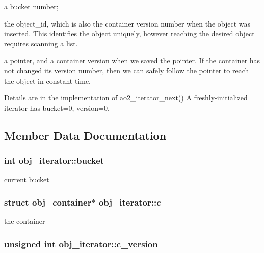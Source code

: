 \begin{DoxyItemize}
\item a bucket number;
\item the object\_\-id, which is also the container version number when the object was inserted. This identifies the object uniquely, however reaching the desired object requires scanning a list.
\item a pointer, and a container version when we saved the pointer. If the container has not changed its version number, then we can safely follow the pointer to reach the object in constant time.
\end{DoxyItemize}

Details are in the implementation of ao2\_\-iterator\_\-next() A freshly-\/initialized iterator has bucket=0, version=0. 

\subsection{Member Data Documentation}
\hypertarget{structobj__iterator_a5c2c1cc03d280d34568eb6abade757bb}{
\subsubsection[{bucket}]{\setlength{\rightskip}{0pt plus 5cm}int {\bf obj\_\-iterator::bucket}}}
\label{structobj__iterator_a5c2c1cc03d280d34568eb6abade757bb}
current bucket \hypertarget{structobj__iterator_a5ecf21f7dd1f55e01db059a59c9d0d85}{
\subsubsection[{c}]{\setlength{\rightskip}{0pt plus 5cm}struct obj\_\-container$\ast$ {\bf obj\_\-iterator::c}}}
\label{structobj__iterator_a5ecf21f7dd1f55e01db059a59c9d0d85}
the container \hypertarget{structobj__iterator_afb5ef4e84bc1785aa3948f502bae545c}{
\subsubsection[{c\_\-version}]{\setlength{\rightskip}{0pt plus 5cm}unsigned int {\bf obj\_\-iterator::c\_\-version}}}
\label{structobj__iterator_afb5ef4e84bc1785aa3948f502bae545c}
